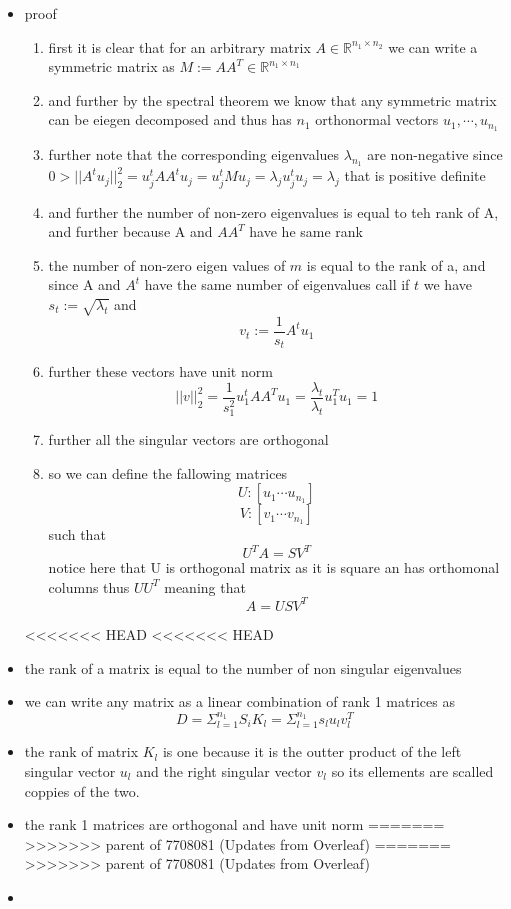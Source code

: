 \documentclass{article}
\begin{document}
\begin{itemize}
\item proof
\begin{enumerate}
    \item first it is clear that for an arbitrary matrix $A\in \mathbb{R}^{n_1\times n_2}$ we can write a symmetric matrix as $M:=AA^{T}\in \mathbb{R}^{n_1\times n_1}$
    \item and further by the spectral theorem we know that any symmetric matrix can be eiegen decomposed and thus has $n_1$ orthonormal vectors $u_1,\cdots , u_{n_1}$
    \item further note that the corresponding eigenvalues $\lambda_{n_1}$ are non-negative since $0> ||A^{t}u_{j}||_{2}^{2}=u_{j}^{t}AA^{t}u_{j}=u_{j}^{t}Mu_{j}=\lambda_{j}u_{j}^{t}u_{j}=\lambda_{j}$ that is positive definite
    \item and further the number of non-zero eigenvalues is equal to teh rank of A, and further because A and $AA^{T}$ have he same rank  
    \item the  number of non-zero eigen values of $m$ is equal to the rank of a, and since A and $A^{t}$ have the same number of eigenvalues call if $t$ we have $s_{t}:=\sqrt{\lambda_{t}}$ and $$v_{t}:=\frac{1}{s_{t}}A^tu_{1}$$
    \item further these vectors have unit norm $$||v||_{2}^{2}=\frac{1}{s_{1}^2}u_{1}^{t}AA^{T}u_{1}=\frac{\lambda _t}{\lambda_t}u_{1}^{T}u_{1}=1$$
    \item further all the singular vectors are orthogonal
    \item so we can define the fallowing matrices $$U:[u_1\cdots u_{n_1}]$$ $$V:[v_1\cdots v_{n_1}]$$ such that $$U^TA=SV^T$$
    notice here that U is orthogonal  matrix as it is square an has orthomonal columns thus $UU^{T}$ meaning that $$A=USV^T$$
\end{enumerate}
<<<<<<< HEAD
<<<<<<< HEAD
\item the rank of a matrix is equal to the number of non singular eigenvalues
\item we can write any matrix as a linear combination of rank 1 matrices as $$D=\Sigma_{l=1}^{n_1}S_{i}K_{l}=\Sigma_{l=1}^{n_1}s_{l}u_{l}v_{l}^{T}$$
\item the rank of matrix $K_{l}$ is one because it is the outter product of the left singular vector $u_{l}$ and the right singular vector $v_{l}$ so its ellements are scalled coppies of the two. 
\item the rank 1 matrices are orthogonal and have unit norm 
=======
>>>>>>> parent of 7708081 (Updates from Overleaf)
=======
>>>>>>> parent of 7708081 (Updates from Overleaf)
\item 
\end{itemize}
\end{document}
